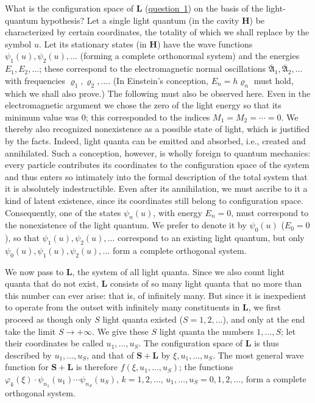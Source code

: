 \documentclass[fontsize=13pt,twoside,openany,headings=normal,parskip=false,bookmarkpackage=false,DIV=calc]{scrbook}
\begin{document}
What is the configuration space of $\boldsymbol{L}$ (\hyperref[problem:III.6.1]{question~1}) on the basis of the light-quantum hypothesis? Let a single light quantum (in the cavity $\boldsymbol H$) be characterized by certain coordinates, the totality of which we shall replace by the symbol $u$. Let its stationary states (in $\boldsymbol H$) have the wave functions $\psi_1(u),\psi_2(u),\ldots$ (forming a complete orthonormal system) and the energies $E_1,E_2,\ldots$; these correspond to the electromagnetic normal oscillations $\overline{\mathfrak A}_1,\overline{\mathfrak A}_2,\ldots$ with frequencies $\varrho_1,\varrho_2,\ldots$. (In Einstein's conception, $E_n=h\varrho_n$ must hold, which we shall also prove.) The following must also be observed here. Even in the electromagnetic argument we chose the zero of the light energy so that its minimum value was $0$; this corresponded to the indices $M_1=M_2=\cdots=0$. We thereby also recognized nonexistence as a possible state of light, which is justified by the facts. Indeed, light quanta can be emitted and absorbed, i.e., created and annihilated. Such a conception, however, is wholly foreign to quantum mechanics: every particle contributes its coordinates to the configuration space of the system and thus enters so intimately into the formal description of the total system that it is absolutely indestructible. Even after its annihilation, we must ascribe to it a kind of latent existence, since its coordinates still belong to configuration space. Consequently, one of the states $\psi_n(u)$, with energy $E_n=0$, must correspond to the nonexistence of the light quantum. We prefer to denote it by $\psi_0(u)$ ($E_0=0$), so that $\psi_1(u),\psi_2(u),\ldots$
\hypertarget{origpage-146}{}correspond to an existing light quantum, but only $\psi_0(u),\psi_1(u),\psi_2(u),\ldots$ form a complete orthogonal system.

We now pass to $\boldsymbol{L}$, the system of all light quanta. Since we also count light quanta that do not exist, $\boldsymbol{L}$ consists of so many light quanta that no more than this number can ever arise: that is, of infinitely many. But since it is inexpedient to operate from the outset with infinitely many constituents in $\boldsymbol{L}$, we first proceed as though only $S$ light quanta existed ($S=1,2,\ldots$), and only at the end take the limit $S\longrightarrow+\infty$. We give these $S$ light quanta the numbers $1,\ldots,S$; let their coordinates be called $u_1,\ldots,u_S$. The configuration space of $\boldsymbol{L}$ is thus described by $u_1,\ldots,u_S$, and that of $\boldsymbol{S}+\boldsymbol{L}$ by $\xi,u_1,\ldots,u_S$. The most general wave function for $\boldsymbol{S}+\boldsymbol{L}$ is therefore $f(\xi,u_1,\ldots,u_S)$; the functions $\varphi_k(\xi)\cdot\psi_{n_1}(u_1)\cdots\psi_{n_S}(u_S)$, $k=1,2,\ldots$, $u_1,\ldots,u_S=0,1,2,\ldots$, form a complete orthogonal system.
\end{document}
